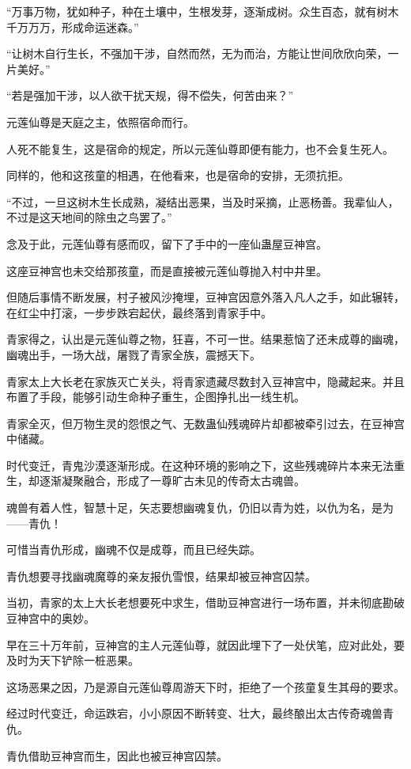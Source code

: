 \begin{this_body}
“万事万物，犹如种子，种在土壤中，生根发芽，逐渐成树。众生百态，就有树木千万万万，形成命运迷森。”

“让树木自行生长，不强加干涉，自然而然，无为而治，方能让世间欣欣向荣，一片美好。”

“若是强加干涉，以人欲干扰天规，得不偿失，何苦由来？”

元莲仙尊是天庭之主，依照宿命而行。

人死不能复生，这是宿命的规定，所以元莲仙尊即便有能力，也不会复生死人。

同样的，他和这孩童的相遇，在他看来，也是宿命的安排，无须抗拒。

“不过，一旦这树木生长成熟，凝结出恶果，当及时采摘，止恶杨善。我辈仙人，不过是这天地间的除虫之鸟罢了。”

念及于此，元莲仙尊有感而叹，留下了手中的一座仙蛊屋豆神宫。

这座豆神宫也未交给那孩童，而是直接被元莲仙尊抛入村中井里。

但随后事情不断发展，村子被风沙掩埋，豆神宫因意外落入凡人之手，如此辗转，在红尘中打滚，一步步跌宕起伏，最终落到青家手中。

青家得之，认出是元莲仙尊之物，狂喜，不可一世。结果惹恼了还未成尊的幽魂，幽魂出手，一场大战，屠戮了青家全族，震撼天下。

青家太上大长老在家族灭亡关头，将青家遗藏尽数封入豆神宫中，隐藏起来。并且布置了手段，能够引动生命种子重生，企图挣扎出一线生机。

青家全灭，但万物生灵的怨恨之气、无数蛊仙残魂碎片却都被牵引过去，在豆神宫中储藏。

时代变迁，青鬼沙漠逐渐形成。在这种环境的影响之下，这些残魂碎片本来无法重生，却逐渐凝聚融合，形成了一尊旷古未见的传奇太古魂兽。

魂兽有着人性，智慧十足，矢志要想幽魂复仇，仍旧以青为姓，以仇为名，是为——青仇！

可惜当青仇形成，幽魂不仅是成尊，而且已经失踪。

青仇想要寻找幽魂魔尊的亲友报仇雪恨，结果却被豆神宫囚禁。

当初，青家的太上大长老想要死中求生，借助豆神宫进行一场布置，并未彻底勘破豆神宫中的奥妙。

早在三十万年前，豆神宫的主人元莲仙尊，就因此埋下了一处伏笔，应对此处，要及时为天下铲除一桩恶果。

这场恶果之因，乃是源自元莲仙尊周游天下时，拒绝了一个孩童复生其母的要求。

经过时代变迁，命运跌宕，小小原因不断转变、壮大，最终酿出太古传奇魂兽青仇。

青仇借助豆神宫而生，因此也被豆神宫囚禁。


\end{this_body}
